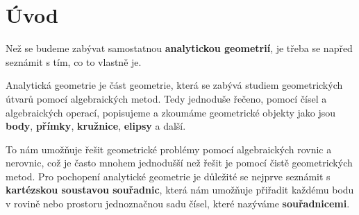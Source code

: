 \section{Úvod}

Než se budeme zabývat samostatnou \textbf{analytickou geometrií},
je třeba se napřed seznámit s tím, co to vlastně je.

Analytická geometrie je část geometrie, 
která se zabývá studiem geometrických útvarů pomocí 
algebraických metod. Tedy jednoduše řečeno, pomocí čísel a algebraických operací,
popisujeme a zkoumáme geometrické objekty jako jsou \textbf{body}, \textbf{přímky}, \textbf{kružnice}, \textbf{elipsy} a další.

To nám umožňuje řešit geometrické problémy pomocí algebraických rovnic a nerovnic,
což je často mnohem jednodušší než řešit je pomocí čistě geometrických metod.
Pro pochopení analytické geometrie je důležité se nejprve seznámit s \textbf{kartézskou soustavou souřadnic},
která nám umožňuje přiřadit každému bodu v rovině nebo prostoru jednoznačnou sadu čísel, které nazýváme \textbf{souřadnicemi}.